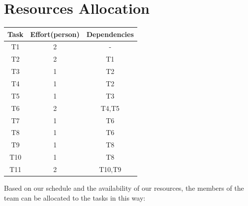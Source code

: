 \documentclass[18pt,oneside,a4paper, titlepage]{article}
\begin{document}
	
\newpage
\section{Resources Allocation}
	\begin{center}
		\centering
		\begin{tabular}{|c |c |c |}
			\hline \textbf{Task} & \textbf{Effort(person)} & \textbf{Dependencies} \\
			\hline		T1 & 2 & -\\
			\hline		T2 & 2 & T1\\
			\hline		T3 & 1 & T2\\
			\hline		T4 & 1 & T2\\
			\hline		T5 & 1 & T3\\
			\hline		T6 & 2 & T4,T5\\
			\hline		T7 & 1 & T6\\
			\hline		T8 & 1 & T6\\
			\hline		T9 & 1 & T8\\
			\hline		T10 & 1 & T8\\
			\hline		T11 & 2 & T10,T9\\
			\hline
		\end{tabular}
	\end{center}
	Based on our schedule and the availability of our resources, the members of the team can be allocated to the tasks in this way:
\end{document}
